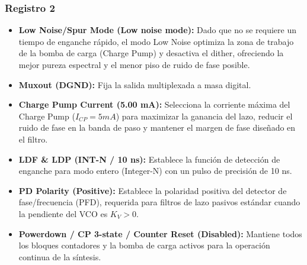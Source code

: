 \documentclass[11pt,a4paper,twoside]{report}
\begin{document}
	
	\subsubsection{Registro 2}
	\begin{itemize}
		\item \textbf{Low Noise/Spur Mode (Low noise mode):} Dado que no se requiere un tiempo de enganche rápido, el modo Low Noise optimiza la zona de trabajo de la bomba de carga (Charge Pump) y desactiva el dither, ofreciendo la mejor pureza espectral y el menor piso de ruido de fase posible.
		
		\item \textbf{Muxout (DGND):} Fija la salida multiplexada a masa digital.
		
		\item \textbf{Charge Pump Current (5.00 mA):} Selecciona la corriente máxima del Charge Pump ($I_{CP} = 5mA$) para maximizar la ganancia del lazo, reducir el ruido de fase en la banda de paso y mantener el margen de fase diseñado en el filtro.
		
		\item \textbf{LDF \& LDP (INT-N / 10 ns):} Establece la función de detección de enganche para modo entero (Integer-N) con un pulso de precisión de 10 ns.
		
		\item \textbf{PD Polarity (Positive):} Establece la polaridad positiva del detector de fase/frecuencia (PFD), requerida para filtros de lazo pasivos estándar cuando la pendiente del VCO es $K_V > 0$.
		
		\item \textbf{Powerdown / CP 3-state / Counter Reset (Disabled):} Mantiene todos los bloques contadores y la bomba de carga activos para la operación continua de la síntesis.
	\end{itemize}
	
\end{document}
